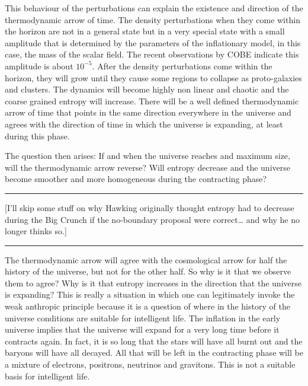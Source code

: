 \documentclass{article}
\begin{document}
This behaviour of the perturbations can explain the existence and
direction of the thermodynamic arrow of time. The density perturbations
when they come within the horizon are not in a general state but in a
very special state with a small amplitude that is determined by the
parameters of the inflationary model, in this case, the mass of the
scalar field. The recent observations by COBE indicate this amplitude is
about \(10^{-5}\). After the density perturbations come within the
horizon, they will grow until they cause some regions to collapse as
proto-galaxies and clusters. The dynamics will become highly non linear
and chaotic and the coarse grained entropy will increase. There will be
a well defined thermodynamic arrow of time that points in the same
direction everywhere in the universe and agrees with the direction of
time in which the universe is expanding, at least during this phase.

The question then arises: If and when the universe reaches and maximum
size, will the thermodynamic arrow reverse? Will entropy decrease and
the universe become smoother and more homogeneous during the contracting
phase?

\begin{center}\rule{0.5\linewidth}{0.5pt}\end{center}

{[}I'll skip some stuff on why Hawking originally thought entropy had to
decrease during the Big Crunch if the no-boundary proposal were
correct\ldots{} and why he no longer thinks so.{]}

\begin{center}\rule{0.5\linewidth}{0.5pt}\end{center}

The thermodynamic arrow will agree with the cosmological arrow for half
the history of the universe, but not for the other half. So why is it
that we observe them to agree? Why is it that entropy increases in the
direction that the universe is expanding? This is really a situation in
which one can legitimately invoke the weak anthropic principle because
it is a question of where in the history of the universe conditions are
suitable for intelligent life. The inflation in the early universe
implies that the universe will expand for a very long time before it
contracts again. In fact, it is so long that the stars will have all
burnt out and the baryons will have all decayed. All that will be left
in the contracting phase will be a mixture of electrons, positrons,
neutrinos and gravitons. This is not a suitable basis for intelligent
life.
\end{document}
